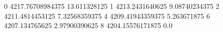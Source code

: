 0 4217.76708984375 13.611328125
1 4213.2431640625 9.08740234375
2 4211.4814453125 7.32568359375
4 4209.41943359375 5.263671875
6 4207.134765625 2.97900390625
8 4204.15576171875 0.0
